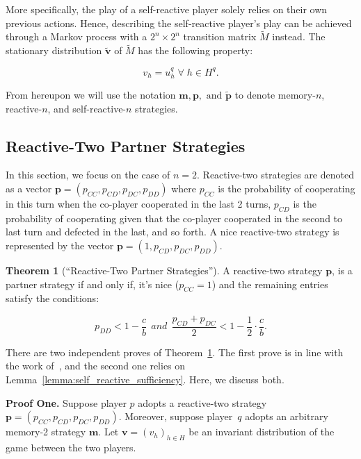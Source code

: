 \documentclass{article}
\theoremstyle{definition}
\newtheorem{theorem}{Theorem}[section]
\begin{document}
More specifically, the play of a self-reactive player solely relies on their own
previous actions. Hence, describing the self-reactive player's play can be
achieved through a Markov process with a $2^{n}\!\times\!2^{n}$ transition
matrix $\tilde{M}$ instead. The stationary distribution $\mathbf{\tilde{v}}$ of
$\tilde{M}$ has the following property:

\begin{equation}
  v_{h} = u^q_{h} \; \forall \; h \in H^q.
\end{equation}

From hereupon we will use the notation $\mathbf{m}, \mathbf{p}, \text{ and }
\mathbf{\tilde{p}}$ to denote memory-$n$, reactive-$n$, and self-reactive-$n$
strategies.

\subsection{Reactive-Two Partner Strategies}

In this section, we focus on the case of $n=2$. Reactive-two strategies are denoted as a vector
$\mathbf{p}=(p_{CC}, p_{CD}, p_{DC}, p_{DD})$ where $p_{CC}$ is the
probability of cooperating in this turn when the co-player cooperated in the
last 2 turns, $p_{CD}$ is the probability of cooperating given that the
co-player cooperated in the second to last turn and defected in the last, and so
forth. A nice reactive-two strategy is represented by the vector $\mathbf{p}=(1,
p_{CD}, p_{DC}, p_{DD})$.

\begin{theorem}[``Reactive-Two Partner Strategies'']\label{theorem:reactive_two_partner_strategies}
A reactive-two strategy $\mathbf{p}$, is a partner strategy if and only if,
it's nice ($p_{CC} = 1$) and the remaining entries satisfy the conditions:

\begin{equation}\label{eq:two_bit_conditions}
  \displaystyle p_{DD} < 1\!-\! \frac{c}{b}  ~~and~~ \displaystyle \frac{p_{CD} + p_{DC}}{2} < 1- \frac{1}{2} \cdot \frac{c}{b}.
\end{equation}
\end{theorem}

There are two independent proves of
Theorem~\ref{theorem:reactive_two_partner_strategies}. The first prove is
in line with the work of~\citep{akin:EGADS:2016}, and the second one relies on
Lemma~\ref{lemma:self_reactive_sufficiency}. Here, we discuss both.

{\bf Proof One.} Suppose player $p$ adopts a
reactive-two strategy $\mathbf{p}\!=\!(p_{CC},p_{CD}, p_{DC}, p_{DD})$.
Moreover, suppose player~$q$ adopts an arbitrary memory-2 strategy $\mathbf{m}$.
Let $\mathbf{v}=(v_h)_{h\in H}$ be an invariant distribution of the game between
the two players.
\end{document}
